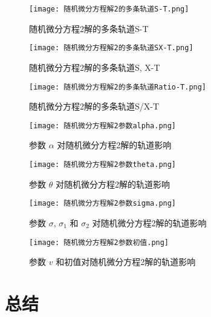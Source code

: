 \documentclass{article}
\begin{document}
\begin{figure}[H]
    \centering
    \texttt{[image: 随机微分方程解2的多条轨道S-T.png]}
    \caption{随机微分方程2解的多条轨道S-T}
    \label{fig:SDE2_S}
    \end{figure}

\begin{figure}[H]
    \centering
    \texttt{[image: 随机微分方程解2的多条轨道SX-T.png]}
    \caption{随机微分方程2解的多条轨道S, X-T}
    \label{fig:SDE2_SX}
    \end{figure}


\begin{figure}[H]
    \centering
    \texttt{[image: 随机微分方程解2的多条轨道Ratio-T.png]}
    \caption{随机微分方程2解的多条轨道S/X-T}
    \label{fig:SDE2_Ratio}
    \end{figure}

\begin{figure}[H]
    \centering
    \texttt{[image: 随机微分方程解2参数alpha.png]}
    \caption{参数 $\alpha$ 对随机微分方程2解的轨道影响}
    \label{fig:SDE12_alpha}
    \end{figure}


\begin{figure}[H]
    \centering
    \texttt{[image: 随机微分方程解2参数theta.png]}
    \caption{参数 $\theta$ 对随机微分方程2解的轨道影响}
    \label{fig:SDE2_theta}
    \end{figure}



\begin{figure}[H]
    \centering
    \texttt{[image: 随机微分方程解2参数sigma.png]}
    \caption{参数 $\sigma$, $\sigma_1$ 和 $\sigma_2$ 对随机微分方程2解的轨道影响}
    \label{fig:SDE2_sigma}
    \end{figure}    

\begin{figure}[H]
    \centering
    \texttt{[image: 随机微分方程解2参数初值.png]}
    \caption{参数 $v$ 和初值对随机微分方程2解的轨道影响}
    \label{fig:SDE2_x0}
    \end{figure}








\section{总结}









\end{document}
